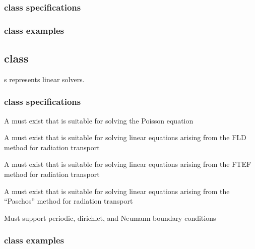 \documentclass[11pt]{article}
\begin{document}
\subsubsection{ class specifications} \label{sss:discret-specifications}

\subsubsection{ class examples} \label{sss:discret-usecases}

\subsection{ class} \label{ss:solver}

s represents linear solvers.

\subsubsection{ class specifications} \label{sss:solver-specifications}

\BeginENUMERATE
\item  A   must exist that is suitable for solving the Poisson equation
\item  A   must exist that is suitable for solving linear equations arising from the FLD method for radiation transport
\item  A   must exist that is suitable for solving linear equations arising from the FTEF method for radiation transport
\item  A   must exist that is suitable for solving linear equations arising from the ``Paschos'' method for radiation transport
\item Must support periodic, dirichlet, and Neumann boundary conditions
\EndENUMERATE


\subsubsection{ class examples} \label{sss:solver-usecases}

\end{document}
